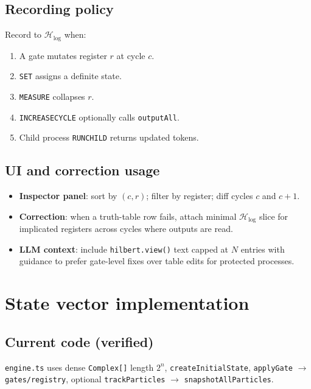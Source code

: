 \documentclass[11pt,a4paper]{article}
\newcommand{\HS}{\mathcal{H}_{\mathrm{log}}}
\begin{document}
\subsection{Recording policy}

Record to $\HS$ when:
\begin{enumerate}
  \item A gate mutates register $r$ at cycle $c$.
  \item \texttt{SET} assigns a definite state.
  \item \texttt{MEASURE} collapses $r$.
  \item \texttt{INCREASECYCLE} optionally calls \texttt{outputAll}.
  \item Child process \texttt{RUNCHILD} returns updated tokens.
\end{enumerate}

\subsection{UI and correction usage}

\begin{itemize}
  \item \textbf{Inspector panel}: sort by $(c, r)$; filter by register; diff cycles $c$ and $c+1$.
  \item \textbf{Correction}: when a truth-table row fails, attach minimal $\HS$ slice for implicated registers across cycles where outputs are read.
  \item \textbf{LLM context}: include \texttt{hilbert.view()} text capped at $N$ entries with guidance to prefer gate-level fixes over table edits for protected processes.
\end{itemize}

\section{State vector implementation}

\subsection{Current code (verified)}

\texttt{engine.ts} uses dense \texttt{Complex[]} length $2^n$, \texttt{createInitialState}, \texttt{applyGate} $\rightarrow$ \texttt{gates/registry}, optional \texttt{trackParticles} $\rightarrow$ \texttt{snapshotAllParticles}.
\end{document}
